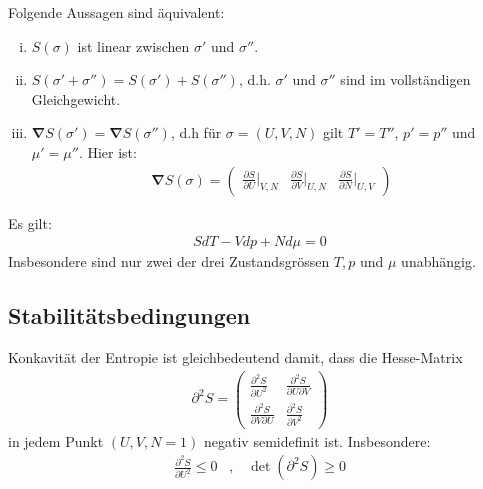 \begin{theorem}
    Folgende Aussagen sind äquivalent:
    \begin{enumerate}[(i)]
        \item $S(\sigma)$ ist linear zwischen $\sigma'$ und $\sigma''$.
        \item $S(\sigma' + \sigma'') = S(\sigma') + S(\sigma'')$, d.h.
            $\sigma'$ und $\sigma''$ sind im vollständigen Gleichgewicht.
        \item $\mathbf{\nabla} S(\sigma') = \mathbf{\nabla} S(\sigma'')$, d.h
            für $\sigma = (U,V,N)$ gilt $T' = T''$, $p' = p''$ und $\mu' = \mu''$.
            Hier ist:
            \begin{align*}
                \mathbf{\nabla} S(\sigma) = \begin{pmatrix}
                    \frac{\partial S}{\partial U} \Big|_{V,N} &
                    \frac{\partial S}{\partial V} \Big|_{U,N} &
                    \frac{\partial S}{\partial N} \Big|_{U,V}
                \end{pmatrix}
            \end{align*}
    \end{enumerate}
\end{theorem}

\begin{theorem}
    Es gilt:
    \begin{align*}
        S dT - V dp + N d \mu = 0
    \end{align*}
    Insbesondere sind nur zwei der drei Zustandsgrössen $T,p$ und $\mu$
    unabhängig.
\end{theorem}

\subsection{Stabilitätsbedingungen}

Konkavität der Entropie ist gleichbedeutend damit, dass die Hesse-Matrix
\begin{align*}
    \partial^2 S = \begin{pmatrix}
        \frac{\partial^2 S}{\partial U^2} &
        \frac{\partial^2 S}{\partial U \partial V} \\
        \frac{\partial^2 S}{\partial V \partial U} &
        \frac{\partial^2 S}{\partial V^2}
    \end{pmatrix}
\end{align*}
in jedem Punkt $(U,V,N=1)$ negativ semidefinit ist. Insbesondere:
\begin{align*}
    \frac{\partial^2 S}{\partial U^2} \leq 0
    \hspace{10pt} , \hspace{10pt}
    \det (\partial^2 S) \geq 0
\end{align*}

